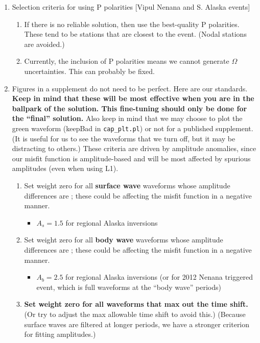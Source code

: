 \begin{enumerate}
\item Selection criteria for using P polarities [Vipul Nenana and S. Alaska events]
%
\begin{enumerate}
\item If there is no reliable solution, then use the best-quality P polarities. These tend to be stations that are closest to the event. (Nodal stations are avoided.)
\item Currently, the inclusion of P polarities means we cannot generate $\Omega$ uncertainties. This can probably be fixed.
\end{enumerate}

\item Figures in a supplement do not need to be perfect. Here are our standards. {\bf Keep in mind that these will be most effective when you are in the ballpark of the solution. This fine-tuning should only be done for the ``final'' solution.} Also keep in mind that we may choose to plot the green waveform (keepBad in \verb+cap_plt.pl+) or not for a published supplement. (It is useful for us to see the waveforms that we turn off, but it may be distracting to others.) These criteria are driven by amplitude anomalies, since our misfit function is amplitude-based and will be most affected by spurious amplitudes (even when using L1).
%
\begin{enumerate}
\item Set weight zero for all {\bf surface wave} waveforms whose amplitude differences are ; these could be affecting the misfit function in a negative manner.
\begin{itemize}
\item $A_s = 1.5$ for regional Alaska inversions
\end{itemize}

\item Set weight zero for all {\bf body wave} waveforms whose amplitude differences are ; these could be affecting the misfit function in a negative manner.
\begin{itemize}
\item $A_b = 2.5$ for regional Alaska inversions (or for 2012 Nenana triggered event, which is full waveforms at the ``body wave'' periods)
\end{itemize}

\item {\bf Set weight zero for all waveforms that max out the time shift.} (Or try to adjust the max allowable time shift to avoid this.) (Because surface waves are filtered at longer periods, we have a stronger criterion for fitting amplitudes.)


\end{enumerate}
\end{enumerate}
